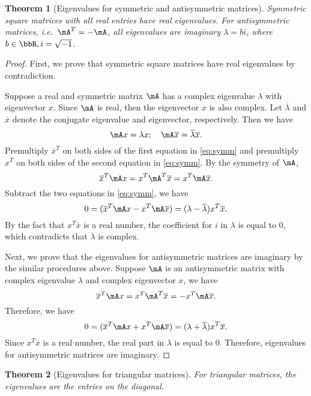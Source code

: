 \documentclass[11pt]{article}
\theoremstyle{plain}
\newtheorem{thm}{Theorem}[section]
\theoremstyle{definition}
\begin{document}
\begin{thm}[Eigenvalues for symmetric and antisymmetric matrices]\label{def:symmeign}
	Symmetric square matrices  with all real entries have real eigenvalues. For antisymmetric matrices,  i.e.\ $\mA^T = - \mA$, all eigenvalues are imaginary $\lambda = b i$, where $b \in \bbR, i = \sqrt{-1}$.
\end{thm}
\begin{proof}
	First, we prove that symmetric square matrices have real eigenvalues by contradiction. 
	
	Suppose a real and symmetric matrix $\mA$ has a complex eigenvalue $\lambda$ with eigenvector $x$. Since $\mA$ is real, then the eigenvector $x$ is also complex. Let $\overline \lambda$ and $\overline x$ denote the conjugate eigenvalue and eigenvector, respectively. Then we have
	\begin{equation}\label{eq:symm}
		\mA x = \lambda x;\quad \mA \overline x = \overline \lambda \overline x.
	\end{equation} 
	Premultiply $\overline x^T$ on both sides of the first equation in \eqref{eq:symm} and premultiply $x^T$ on both sides of the second equation in \eqref{eq:symm}. By the symmetry of $\mA$,
	\[ \overline x^T \mA x  = x^T \mA^T \overline x = x^T \mA \overline x .\]
	Subtract the two equations in \eqref{eq:symm}, we have
	\[  0 = ( \overline x^T \mA x -  x^T \mA \overline x ) = (\lambda - \overline \lambda) x^T \overline x.  \]
	By the fact that $x^T \overline x$ is a real number, the coefficient for $i$ in $\lambda$ is equal to 0, which contradicts that $\lambda$ is complex.
	
	Next, we prove that the eigenvalues for antisymmetric matrices are imaginary by the similar procedures above. 
	Suppose $\mA$ is an antisymmetric matrix with complex eigenvalue $\lambda$ and complex eigenvector $x$, we have
	\[ \overline x^T \mA x  = x^T \mA^T \overline x  =  -x^T \mA \overline x .  \] 
	Therefore, we have
	\[  0 = ( \overline x^T \mA x +  x^T \mA \overline x ) = (\lambda + \overline \lambda) x^T \overline x.   \]
	Since $x^T \overline x$ is a real number, the real part in $\lambda$ is equal to 0. Therefore, eigenvalues for antisymmetric matrices are imaginary.
\end{proof}

\begin{thm}[Eigenvalues for triangular matrices]\label{thm:trianeigen}
	For triangular matrices, the eigenvalues are the entries on the diagonal.
\end{thm}
\end{document}
